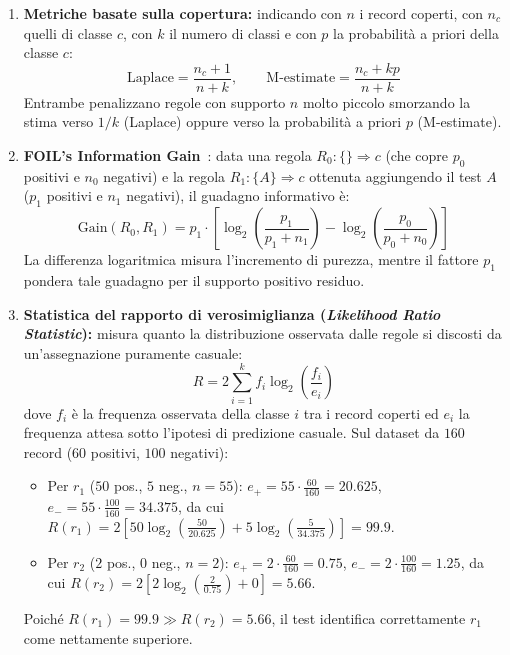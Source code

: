 \begin{enumerate}
    \item \textbf{Metriche basate sulla copertura:} indicando con $n$ i record coperti, con $n_c$ quelli di classe $c$, con $k$ il numero di classi e con $p$ la probabilit\`a a priori della classe $c$:
    \begin{equation}
        \text{Laplace} = \frac{n_c + 1}{n + k}, \qquad \text{M-estimate} = \frac{n_c + k p}{n + k}
    \end{equation}
    Entrambe penalizzano regole con supporto $n$ molto piccolo smorzando la stima verso $1/k$ (Laplace) oppure verso la probabilit\`a a priori $p$ (M-estimate).

    \item \textbf{FOIL's Information Gain}~\cite{quinlan1990}: data una regola $R_0 : \{\} \Rightarrow c$ (che copre $p_0$ positivi e $n_0$ negativi) e la regola $R_1 : \{A\} \Rightarrow c$ ottenuta aggiungendo il test $A$ ($p_1$ positivi e $n_1$ negativi), il guadagno informativo \`e:
    \begin{equation}
        \text{Gain}(R_0, R_1) = p_1 \cdot \left[ \log_2\left(\frac{p_1}{p_1 + n_1}\right) - \log_2\left(\frac{p_0}{p_0 + n_0}\right) \right]
    \end{equation}
    La differenza logaritmica misura l'incremento di purezza, mentre il fattore $p_1$ pondera tale guadagno per il supporto positivo residuo.

    \item \textbf{Statistica del rapporto di verosimiglianza (\textit{Likelihood Ratio Statistic}):} misura quanto la distribuzione osservata dalle regole si discosti da un'assegnazione puramente casuale:
    \begin{equation}
        R = 2 \sum_{i=1}^{k} f_i \log_2\left(\frac{f_i}{e_i}\right)
    \end{equation}
    dove $f_i$ \`e la frequenza osservata della classe $i$ tra i record coperti ed $e_i$ la frequenza attesa sotto l'ipotesi di predizione casuale. Sul dataset da $160$ record ($60$ positivi, $100$ negativi):
    \begin{itemize}
        \item Per $r_1$ ($50$ pos., $5$ neg., $n=55$): $e_+ = 55 \cdot \frac{60}{160} = 20.625$, $e_- = 55 \cdot \frac{100}{160} = 34.375$, da cui $R(r_1) = 2\left[50\log_2\!\left(\frac{50}{20.625}\right) + 5\log_2\!\left(\frac{5}{34.375}\right)\right] = 99.9$.
        \item Per $r_2$ ($2$ pos., $0$ neg., $n=2$): $e_+ = 2 \cdot \frac{60}{160} = 0.75$, $e_- = 2 \cdot \frac{100}{160} = 1.25$, da cui $R(r_2) = 2\left[2\log_2\!\left(\frac{2}{0.75}\right) + 0\right] = 5.66$.
    \end{itemize}
    Poich\'e $R(r_1) = 99.9 \gg R(r_2) = 5.66$, il test identifica correttamente $r_1$ come nettamente superiore.
\end{enumerate}

